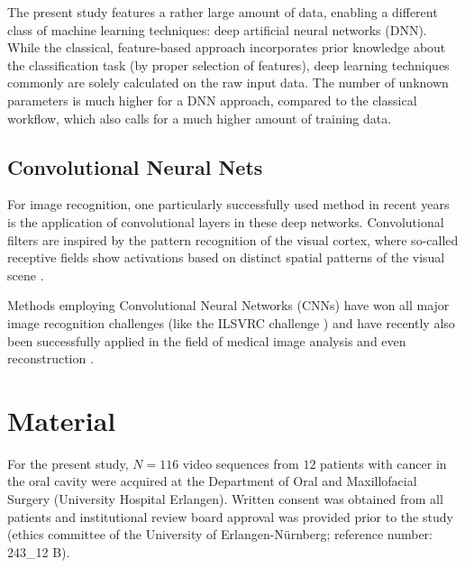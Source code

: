 \documentclass[fleqn,10pt]{wlscirep}
\begin{document}
The present study features a rather large amount of data, enabling
a different class of machine learning techniques: deep
artificial neural networks (DNN).
While the classical, feature-based
approach incorporates prior knowledge about the classification task
(by proper selection of features), deep learning techniques commonly
are solely calculated on the raw input data. The number of unknown
parameters is much higher for a DNN approach, compared to the
classical workflow, which also calls for a much higher amount of
training data. 



\subsection{Convolutional Neural Nets}
For image recognition, one
particularly successfully used method in recent years is the
application of convolutional layers in these deep networks. Convolutional
filters are inspired by the pattern recognition of the
visual cortex, where so-called receptive fields show activations based
on distinct spatial patterns of the visual scene \cite{Hubel:1968ep}. 


Methods employing Convolutional Neural Networks (CNNs) have won all
major image recognition challenges (like the ILSVRC challenge
\cite{Russakovsky:2015bu}) and have recently also been successfully
applied in the field of medical image analysis
\cite{Shin:2016cx,Roth:2016eg,Esteva:2017ct,Litjens:2016fr} and even reconstruction \cite{Wurfl:2016jq}. 





\section{Material}
For the present study, $N=116$ video sequences from $12$ patients with cancer in
the oral cavity were acquired at the Department of Oral and Maxillofacial Surgery (University Hospital Erlangen). Written consent was obtained from all patients and institutional review board approval
was provided prior to the study (ethics committee of the University of Erlangen-N{\"u}rnberg; reference number: 243\_12 B).
 
\end{document}
